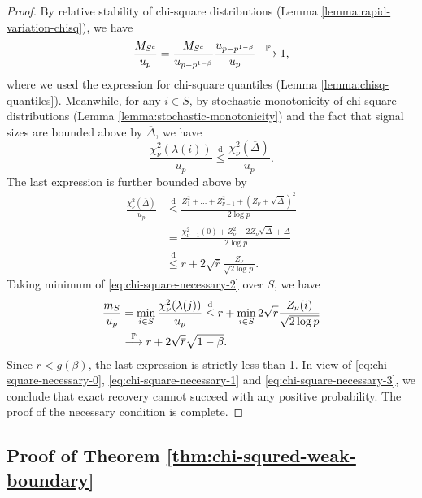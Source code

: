 \begin{proof}
By relative stability of chi-square distributions (Lemma \ref{lemma:rapid-variation-chisq}), we have
\begin{equation} \label{eq:chi-square-necessary-1}
    \frac{M_{S^c}}{u_{p}} = \frac{M_{S^c}}{u_{p-p^{1-\beta}}} \frac{u_{p-p^{1-\beta}}}{u_{p}} \stackrel{\P}{\longrightarrow} 1,
\end{equation}
where we used the expression for chi-square quantiles (Lemma \ref{lemma:chisq-quantiles}).
Meanwhile, for any $i\in S$, by stochastic monotonicity of chi-square distributions (Lemma \ref{lemma:stochastic-monotonicity}) and the fact that signal sizes are bounded above by $\overline{\Delta}$, we have
\begin{equation*}
    \frac{\chi_\nu^2(\lambda(i))}{u_p} \stackrel{\mathrm{d}}{\le} \frac{\chi_\nu^2(\overline{\Delta})}{u_p}.
\end{equation*}
The last expression is further bounded above by
\begin{align}
    \frac{\chi_\nu^2(\overline{\Delta})}{u_p} 
    &\stackrel{\mathrm{d}}{\le} \frac{Z_1^2 + \ldots + Z_{\nu-1}^2 + (Z_\nu + \sqrt{\overline{\Delta}})^2}{2\log{p}} \nonumber \\
    &= \frac{\chi_{\nu-1}^2(0) + Z_\nu^2+ 2Z_\nu\sqrt{\overline{\Delta}} + \overline{\Delta}}{2\log{p}} \nonumber \\
    &\stackrel{\mathrm{d}}{\le} r + 2\sqrt{\overline{r}} \frac{Z_\nu}{\sqrt{2\log{p}}}. \label{eq:chi-square-necessary-2}
\end{align}
Taking minimum of \eqref{eq:chi-square-necessary-2} over $S$, we have
\begin{align}
    \frac{m_S}{u_p} &= \min_{i\in S} \frac{\chi_\nu^2(\lambda(j))}{u_p} 
    \stackrel{\mathrm{d}}{\le} r + \min_{i\in S} 2\sqrt{\overline{r}} \frac{Z_\nu(i)}{\sqrt{2\log{p}}} \nonumber \\
    &\stackrel{\P}{\longrightarrow} r + 2\sqrt{\overline{r}}\sqrt{1-\beta}. \label{eq:chi-square-necessary-3}
\end{align}
Since $\overline{r} < g(\beta)$, the last expression is strictly less than 1.
In view of \eqref{eq:chi-square-necessary-0}, \eqref{eq:chi-square-necessary-1} and \eqref{eq:chi-square-necessary-3}, we conclude that exact recovery cannot succeed with any positive probability.
The proof of the necessary condition is complete.
\end{proof}

\subsection{Proof of Theorem \ref{thm:chi-squred-weak-boundary}}

